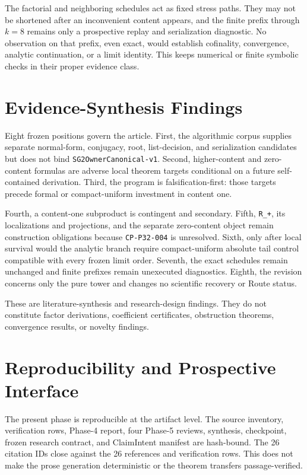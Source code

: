 \documentclass[11pt]{article}
\begin{document}
The factorial and neighboring schedules act as fixed stress paths. They
may not be shortened after an inconvenient content appears, and the
finite prefix through $k=8$ remains only a prospective replay and
serialization diagnostic. No observation on that prefix, even exact,
would establish cofinality, convergence, analytic continuation, or a
limit identity. This keeps numerical or finite symbolic checks in their
proper evidence class.

\hypertarget{5-evidence-synthesis-findings}{%
\section{Evidence-Synthesis
Findings}\label{5-evidence-synthesis-findings}}

Eight frozen positions govern the article. First, the algorithmic corpus
supplies separate normal-form, conjugacy, root, list-decision, and
serialization candidates but does not bind
\texttt{SG2OwnerCanonical-v1}. Second, higher-content and zero-content
formulas are adverse local theorem targets conditional on a future
self-contained derivation. Third, the program is falsification-first:
those targets precede formal or compact-uniform investment in content
one.

Fourth, a content-one subproduct is contingent and secondary. Fifth,
\texttt{R\_+}, its localizations and projections, and the separate
zero-content object remain construction obligations because
\texttt{CP-P32-004} is unresolved. Sixth, only after local survival
would the analytic branch require compact-uniform absolute tail control
compatible with every frozen limit order. Seventh, the exact schedules
remain unchanged and finite prefixes remain unexecuted diagnostics.
Eighth, the revision concerns only the pure tower and changes no
scientific recovery or Route status.

These are literature-synthesis and research-design findings. They do not
constitute factor derivations, coefficient certificates, obstruction
theorems, convergence results, or novelty findings.

\hypertarget{6-reproducibility-and-prospective-interface}{%
\section{Reproducibility and Prospective
Interface}\label{6-reproducibility-and-prospective-interface}}

The present phase is reproducible at the artifact level. The source
inventory, verification rows, Phase-4 report, four Phase-5 reviews,
synthesis, checkpoint, frozen research contract, and ClaimIntent manifest are
hash-bound. The 26 citation IDs close against the 26 references and
verification rows. This does not make the prose generation deterministic
or the theorem transfers passage-verified.
\end{document}
